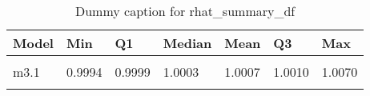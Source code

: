 \begin{table}
\centering
\caption{Dummy caption for rhat_summary_df}
\centering
\fontsize{10}{12}\selectfont
\begin{tabular}[t]{lllllll}
\toprule
Model & Min & Q1 & Median & Mean & Q3 & Max\\
\midrule
\cellcolor{gray!10}{m2} & \cellcolor{gray!10}{0.9993} & \cellcolor{gray!10}{1.0005} & \cellcolor{gray!10}{1.0011} & \cellcolor{gray!10}{1.0012} & \cellcolor{gray!10}{1.0016} & \cellcolor{gray!10}{1.0064}\\
m3.1 & 0.9994 & 0.9999 & 1.0003 & 1.0007 & 1.0010 & 1.0070\\
\cellcolor{gray!10}{m4} & \cellcolor{gray!10}{0.9992} & \cellcolor{gray!10}{0.9996} & \cellcolor{gray!10}{1.0002} & \cellcolor{gray!10}{1.0003} & \cellcolor{gray!10}{1.0007} & \cellcolor{gray!10}{1.0027}\\
\bottomrule
\end{tabular}
\end{table}
